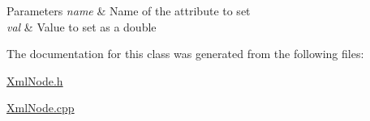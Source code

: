 \begin{DoxyParams}{Parameters}
{\em name} & Name of the attribute to set \\
\hline
{\em val} & Value to set as a double \\
\hline
\end{DoxyParams}


The documentation for this class was generated from the following files\+:\begin{DoxyCompactItemize}
\item 
\hyperlink{_xml_node_8h}{Xml\+Node.\+h}\item 
\hyperlink{_xml_node_8cpp}{Xml\+Node.\+cpp}\end{DoxyCompactItemize}
